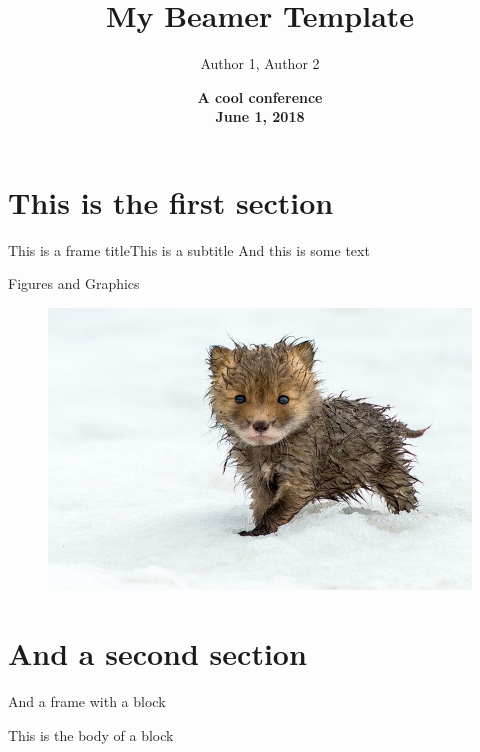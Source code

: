 \documentclass[xcolor=svgnames, 10pt, aspectratio=169]{beamer}
\title{ \color{myblue} \bfseries \LARGE My Beamer Template}
\date{\vfill \color{myblue} \bfseries A cool conference \\[4pt] June 1, 2018}
\author[shortname]{
                   Author 1\inst{1},
                   Author 2\inst{2}
                }
\institute[shortinst]{
                      \inst{1} University 1 \\ 
                      \inst{2} University 2 
                     }
\begin{document}

\section{This is the first section} 


\begin{frame}{This is a frame title}{This is a subtitle}
    And this is some text
\end{frame}


\begin{frame}{Figures and Graphics}
    \begin{figure}
        \centering
        \includegraphics[scale=0.3]{fox}
    \end{figure}
\end{frame}


\section{And a second section}


\begin{frame}{And a frame with a block}

    \begin{tcolorbox}[title=This is the title of a block]
    This is the body of a block 
    \end{tcolorbox}

\end{frame}
\end{document}
